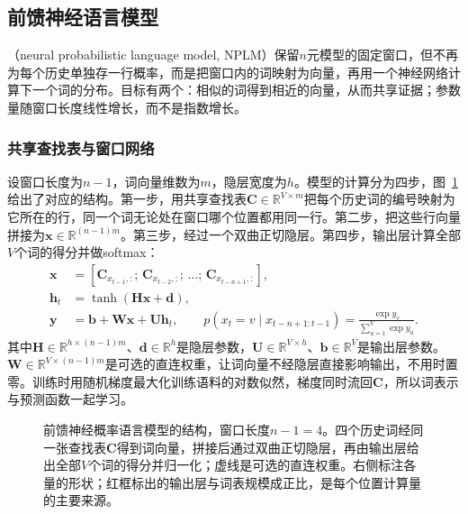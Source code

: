 \subsection{前馈神经语言模型}
\label{sec:nlp-classical-nplm}

（neural probabilistic language model, NPLM）保留$n$元模型的固定窗口，但不再为每个历史单独存一行概率，而是把窗口内的词映射为向量，再用一个神经网络计算下一个词的分布。目标有两个：相似的词得到相近的向量，从而共享证据；参数量随窗口长度线性增长，而不是指数增长。

\subsubsection{共享查找表与窗口网络}
\label{sec:nlp-classical-nplm-structure}

设窗口长度为$n-1$，词向量维数为$m$，隐层宽度为$h$。模型的计算分为四步，图~\ref{fig:nlp-classical-nplm}给出了对应的结构。第一步，用共享查找表$\bm C\in\mathbb R^{V\times m}$把每个历史词的编号映射为它所在的行，同一个词无论处在窗口哪个位置都用同一行。第二步，把这些行向量拼接为$\bm x\in\mathbb R^{(n-1)m}$。第三步，经过一个双曲正切隐层。第四步，输出层计算全部$V$个词的得分并做softmax：
\begin{equation}
  \begin{aligned}
    \bm x&=[\bm C_{x_{t-1},:};\,\bm C_{x_{t-2},:};\,\ldots;\,\bm C_{x_{t-n+1},:}],\\
    \bm h_t&=\tanh(\bm H\bm x+\bm d),\\
    \bm y&=\bm b+\bm W\bm x+\bm U\bm h_t,\qquad
    p(x_t=v\mid x_{t-n+1:t-1})=\frac{\exp y_v}{\sum_{u=1}^{V}\exp y_u}.
  \end{aligned}
  \label{eq:nlp-classical-nplm}
\end{equation}
其中$\bm H\in\mathbb R^{h\times(n-1)m}$、$\bm d\in\mathbb R^{h}$是隐层参数，$\bm U\in\mathbb R^{V\times h}$、$\bm b\in\mathbb R^{V}$是输出层参数。$\bm W\in\mathbb R^{V\times(n-1)m}$是可选的直连权重，让词向量不经隐层直接影响输出，不用时置零。训练时用随机梯度最大化训练语料的对数似然，梯度同时流回$\bm C$，所以词表示与预测函数一起学习。

\begin{figure}[htbp]
  \centering
  
  \caption{前馈神经概率语言模型的结构，窗口长度$n-1=4$。四个历史词经同一张查找表$\bm C$得到词向量，拼接后通过双曲正切隐层，再由输出层给出全部$V$个词的得分并归一化；虚线是可选的直连权重。右侧标注各量的形状；红框标出的输出层与词表规模成正比，是每个位置计算量的主要来源。}
  \label{fig:nlp-classical-nplm}
\end{figure}

